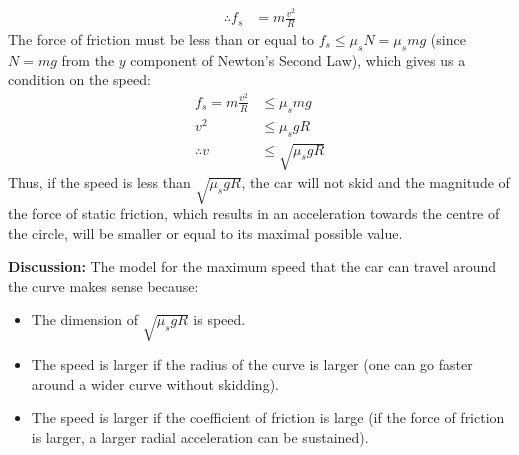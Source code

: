 \begin{example}
\begin{align*}
\therefore f_s &= m\frac{v^2}{R}
\end{align*}
The force of friction must be less than or equal to $f_s\leq\mu_sN=\mu_smg$ (since $N=mg$ from the $y$ component of Newton's Second Law), which gives us a condition on the speed:
\begin{align*}
f_s = m\frac{v^2}{R}&\leq\mu_smg\\
v^2 &\leq \mu_s g R\\
\therefore v &\leq \sqrt{\mu_s g R}
\end{align*}
Thus, if the speed is less than $\sqrt{\mu_s g R}$, the car will not skid and the magnitude of the force of static friction, which results in an acceleration towards the centre of the circle, will be smaller or equal to its maximal possible value.

\textbf{Discussion:} The model for the maximum speed that the car can travel around the curve makes sense because:
\begin{itemize}
\item The dimension of $\sqrt{\mu_s g R}$ is speed.
\item The speed is larger if the radius of the curve is larger (one can go faster around a wider curve without skidding).
\item The speed is larger if the coefficient of friction is large (if the force of friction is larger, a larger radial acceleration can be sustained).
\end{itemize}
\end{example}
\vspace{-0.25cm}
